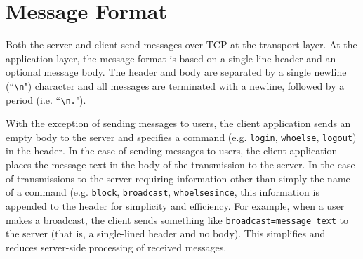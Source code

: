 \documentclass[12pt,a4paper]{article}
\begin{document}
\section{Message Format}
\label{sec:msg_format}

Both the server and client send messages over TCP at the transport layer. At the application layer, the message format is based on a single-line header and an optional message body. The header and body are separated by a single newline (``\verb|\n|") character and all messages are terminated with a newline, followed by a period (i.e. ``\verb|\n.|").

With the exception of sending messages to users, the client application sends an empty body to the server and specifies a command (e.g. \verb|login|, \verb|whoelse|, \verb|logout|) in the header. In the case of sending messages to users, the client application places the message text in the body of the transmission to the server. In the case of transmissions to the server requiring information other than simply the name of a command (e.g. \verb|block|, \verb|broadcast|, \verb|whoelsesince|, this information is appended to the header for simplicity and efficiency. For example, when a user makes a broadcast, the client sends something like \verb|broadcast=message text| to the server (that is, a single-lined header and no body). This simplifies and reduces server-side processing of received messages.
\end{document}
